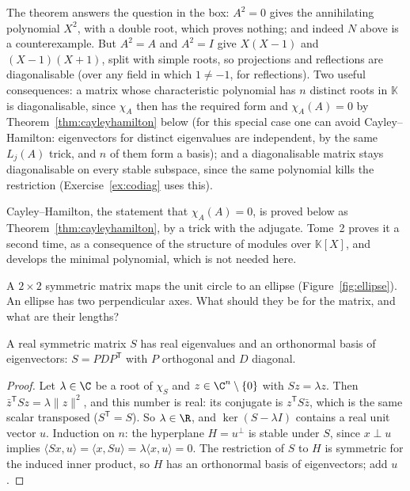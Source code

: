 The theorem answers the question in the box: $A^2=0$ gives the annihilating polynomial $X^2$, with a double root, which proves nothing; and indeed $N$ above is a counterexample. But $A^2=A$ and $A^2=I$ give $X(X-1)$ and $(X-1)(X+1)$, split with simple roots, so projections and reflections are diagonalisable (over any field in which $1\ne-1$, for reflections). Two useful consequences: a matrix whose characteristic polynomial has $n$ distinct roots in $\mathbb K$ is diagonalisable, since $\chi_A$ then has the required form and $\chi_A(A)=0$ by Theorem~\ref{thm:cayleyhamilton} below (for this special case one can avoid Cayley--Hamilton: eigenvectors for distinct eigenvalues are independent, by the same $L_j(A)$ trick, and $n$ of them form a basis); and a diagonalisable matrix stays diagonalisable on every stable subspace, since the same polynomial kills the restriction (Exercise~\ref{ex:codiag} uses this).

\begin{remark}
Cayley--Hamilton, the statement that $\chi_A(A)=0$, is proved below as Theorem~\ref{thm:cayleyhamilton}, by a trick with the adjugate. Tome~2 proves it a second time, as a consequence of the structure of modules over $\mathbb K[X]$, and develops the minimal polynomial, which is not needed here.
\end{remark}

\begin{think}
A $2\times2$ symmetric matrix maps the unit circle to an ellipse (Figure~\ref{fig:ellipse}). An ellipse has two perpendicular axes. What should they be for the matrix, and what are their lengths?
\end{think}

\begin{theorem}\label{thm:spectral}
A real symmetric matrix $S$ has real eigenvalues and an orthonormal basis of eigenvectors: $S=PDP^{\mathsf T}$ with $P$ orthogonal and $D$ diagonal.
\end{theorem}
\begin{proof}
Let $\lambda\in\C$ be a root of $\chi_S$ and $z\in\C^n\setminus\{0\}$ with $Sz=\lambda z$. Then $\bar z^{\mathsf T}Sz=\lambda\|z\|^2$, and this number is real: its conjugate is $z^{\mathsf T}S\bar z$, which is the same scalar transposed ($S^{\mathsf T}=S$). So $\lambda\in\R$, and $\ker(S-\lambda I)$ contains a real unit vector $u$.
Induction on $n$: the hyperplane $H=u^\perp$ is stable under $S$, since $x\perp u$ implies $\langle Sx,u\rangle=\langle x,Su\rangle=\lambda\langle x,u\rangle=0$. The restriction of $S$ to $H$ is symmetric for the induced inner product, so $H$ has an orthonormal basis of eigenvectors; add $u$.
\end{proof}

